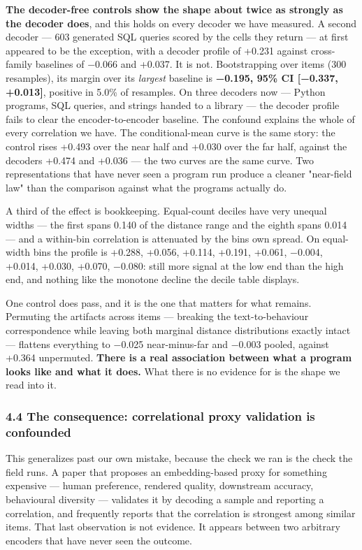 \documentclass[
  10pt,
]{article}
\theoremstyle{plain}
\theoremstyle{definition}
\begin{document}
\textbf{The decoder-free controls show the shape about twice as strongly
as the decoder does}, and this holds on every decoder we have measured.
A second decoder --- 603 generated SQL queries scored by the cells they
return --- at first appeared to be the exception, with a decoder profile
of +0.231 against cross-family baselines of −0.066 and +0.037. It is
not. Bootstrapping over items (300 resamples), its margin over its
\emph{largest} baseline is \textbf{−0.195, 95\% CI {[}−0.337,
+0.013{]}}, positive in 5.0\% of resamples. On three decoders now ---
Python programs, SQL queries, and strings handed to a library --- the
decoder profile fails to clear the encoder-to-encoder baseline. The
confound explains the whole of every correlation we have. The
conditional-mean curve is the same story: the control rises +0.493 over
the near half and +0.030 over the far half, against the
decoder\textquotesingle s +0.474 and +0.036 --- the two curves are the
same curve. Two representations that have never seen a program run
produce a cleaner "near-field law" than the comparison against what the
programs actually do.

A third of the effect is bookkeeping. Equal-count deciles have very
unequal widths --- the first spans 0.140 of the distance range and the
eighth spans 0.014 --- and a within-bin correlation is attenuated by the
bin\textquotesingle s own spread. On equal-width bins the profile is
+0.288, +0.056, +0.114, +0.191, +0.061, −0.004, +0.014, +0.030, +0.070,
−0.080: still more signal at the low end than the high end, and nothing
like the monotone decline the decile table displays.

One control does pass, and it is the one that matters for what remains.
Permuting the artifacts across items --- breaking the text-to-behaviour
correspondence while leaving both marginal distance distributions
exactly intact --- flattens everything to −0.025 near-minus-far and
−0.003 pooled, against +0.364 unpermuted. \textbf{There is a real
association between what a program looks like and what it does.} What
there is no evidence for is the shape we read into it.

\subsubsection{4.4 The consequence: correlational proxy validation is
confounded}\label{44-the-consequence-correlational-proxy-validation-is-confounded}

This generalizes past our own mistake, because the check we ran is the
check the field runs. A paper that proposes an embedding-based proxy for
something expensive --- human preference, rendered quality, downstream
accuracy, behavioural diversity --- validates it by decoding a sample
and reporting a correlation, and frequently reports that the correlation
is strongest among similar items. That last observation is not evidence.
It appears between two arbitrary encoders that have never seen the
outcome.
\end{document}

